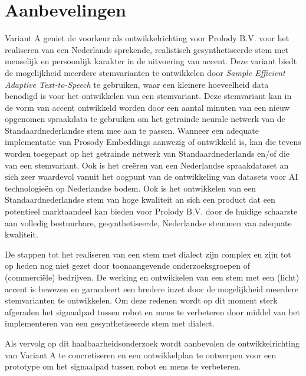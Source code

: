 \section{Aanbevelingen}
Variant A geniet de voorkeur als ontwikkelrichting voor Prolody B.V. voor het realiseren van een Nederlands sprekende, realistisch gesynthetiseerde stem met menselijk en persoonlijk karakter in de uitvoering van accent. Deze variant biedt de mogelijkheid meerdere stemvarianten te ontwikkelen door \textit{Sample Efficient Adaptive Text-to-Speech} te gebruiken, waar een kleinere hoeveelheid data benodigd is voor het ontwikkelen van een stemvariant. Deze stemvariant kan in de vorm van accent ontwikkeld worden door een aantal minuten van een nieuw opgenomen spraakdata te gebruiken om het getrainde neurale netwerk van de Standaardnederlandse stem mee aan te passen. Wanneer een adequate implementatie van Prosody Embeddings aanwezig of ontwikkeld is, kan die tevens worden toegepast op het getrainde netwerk van Standaardnederlands en/of die van een stemvariant. Ook is het creëren van een Nederlandse spraakdataset an sich zeer waardevol vanuit het oogpunt van de ontwikkeling van datasets voor AI technologieën op Nederlandse bodem. Ook is het ontwikkelen van een Standaardnederlandse
stem van hoge kwaliteit an sich een product dat een potentieel marktaandeel kan bieden voor Prolody B.V. door de huidige schaarste aan volledig bestuurbare, gesynthetiseerde, Nederlandse stemmen van adequate kwaliteit.

De stappen tot het realiseren van een stem met dialect zijn complex en zijn tot op heden nog niet gezet door toonaangevende onderzoeksgroepen of (commerciële) bedrijven. De werking en ontwikkelen van een stem met een (licht) accent is bewezen en garandeert een bredere inzet door de mogelijkheid meerdere stemvarianten te ontwikkelen. Om deze redenen wordt op dit moment sterk afgeraden het signaalpad tussen robot en mens te verbeteren door middel van het implementeren van een gesynthetiseerde stem met dialect.

Als vervolg op dit haalbaarheidsonderzoek wordt aanbevolen de ontwikkelrichting van Variant A te concretiseren en een ontwikkelplan te ontwerpen voor een prototype om het signaalpad tussen robot en mens te verbeteren.

